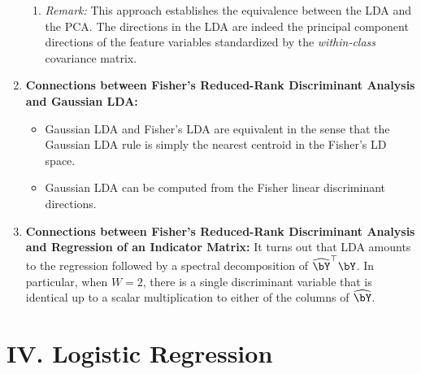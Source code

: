 \documentclass[12pt]{article}
\begin{document}
\begin{enumerate}[label=\textbf{\arabic*.}]
\begin{enumerate}
		\item \textit{Remark:} This approach establishes the equivalence between the LDA and the PCA.  The directions in the LDA are indeed the principal component directions of the feature variables standardized by the \emph{within-class} covariance matrix. 
	\end{enumerate}
	
	\item \textbf{Connections between Fisher's Reduced-Rank Discriminant Analysis and Gaussian LDA:} 
	\begin{itemize}
		\item Gaussian LDA and Fisher's LDA are equivalent in the sense that the Gaussian LDA rule is simply the nearest centroid in the Fisher's LD space. 
		\item Gaussian LDA can be computed from the Fisher linear discriminant directions. 
	\end{itemize}
	
	\item \textbf{Connections between Fisher's Reduced-Rank Discriminant Analysis and Regression of an Indicator Matrix:} It turns out that LDA amounts to the regression followed by a spectral decomposition of $\widehat{\bY}^\top \bY$. In particular, when $W = 2$, there is a single discriminant variable that is identical up to a scalar multiplication to either of the columns of $\widehat{\bY}$. 
	
\end{enumerate}

\section*{IV. Logistic Regression}
\end{document}
